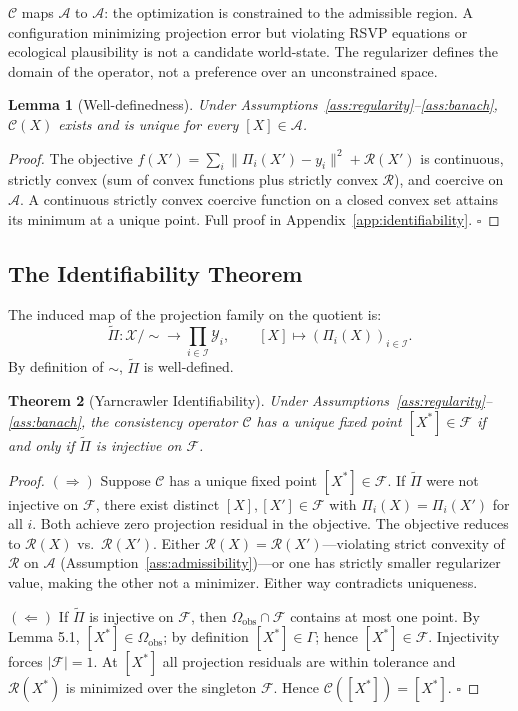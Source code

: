 \documentclass[11pt, oneside]{article}
\newtheorem{theorem}{Theorem}[section]
\newtheorem{lemma}[theorem]{Lemma}
\newcommand{\Xmod}{\mathcal{X}/{\sim}}
\newcommand{\Ftil}{\widetilde{\Pi}}
\begin{document}
$\mathcal{C}$ maps $\mathcal{A}$ to $\mathcal{A}$: the optimization is constrained to the
admissible region. A configuration minimizing projection error but violating RSVP equations
or ecological plausibility is not a candidate world-state. The regularizer defines the
domain of the operator, not a preference over an unconstrained space.

\begin{lemma}[Well-definedness]
Under Assumptions~\ref{ass:regularity}--\ref{ass:banach}, $\mathcal{C}(X)$ exists and is
unique for every $[X] \in \mathcal{A}$.
\end{lemma}
\begin{proof}
The objective $f(X') = \sum_i \|\Pi_i(X') - y_i\|^2 + \mathcal{R}(X')$ is continuous,
strictly convex (sum of convex functions plus strictly convex $\mathcal{R}$), and coercive
on $\mathcal{A}$. A continuous strictly convex coercive function on a closed convex set
attains its minimum at a unique point. Full proof in Appendix~\ref{app:identifiability}.
$\square$
\end{proof}

\subsection{The Identifiability Theorem}

The induced map of the projection family on the quotient is:
\[
\Ftil : \Xmod \longrightarrow \prod_{i \in \mathcal{I}} \mathcal{Y}_i, \qquad
[X] \mapsto (\Pi_i(X))_{i \in \mathcal{I}}.
\]
By definition of $\sim$, $\Ftil$ is well-defined.

\begin{theorem}[Yarncrawler Identifiability]
\label{thm:identifiability}
Under Assumptions~\ref{ass:regularity}--\ref{ass:banach}, the consistency operator
$\mathcal{C}$ has a unique fixed point $[X^*] \in \mathcal{F}$ if and only if $\Ftil$
is injective on $\mathcal{F}$.
\end{theorem}

\begin{proof}
$(\Rightarrow)$ Suppose $\mathcal{C}$ has a unique fixed point $[X^*] \in \mathcal{F}$.
If $\Ftil$ were not injective on $\mathcal{F}$, there exist distinct $[X],[X'] \in \mathcal{F}$
with $\Pi_i(X) = \Pi_i(X')$ for all $i$. Both achieve zero projection residual in the
objective. The objective reduces to $\mathcal{R}(X)$ vs.\ $\mathcal{R}(X')$. Either
$\mathcal{R}(X) = \mathcal{R}(X')$---violating strict convexity of $\mathcal{R}$ on
$\mathcal{A}$ (Assumption~\ref{ass:admissibility})---or one has strictly smaller
regularizer value, making the other not a minimizer. Either way contradicts uniqueness.

$(\Leftarrow)$ If $\Ftil$ is injective on $\mathcal{F}$, then $\Omega_{\mathrm{obs}} \cap
\mathcal{F}$ contains at most one point. By Lemma 5.1, $[X^*] \in \Omega_{\mathrm{obs}}$;
by definition $[X^*] \in \Gamma$; hence $[X^*] \in \mathcal{F}$. Injectivity forces
$|\mathcal{F}| = 1$. At $[X^*]$ all projection residuals are within tolerance and
$\mathcal{R}(X^*)$ is minimized over the singleton $\mathcal{F}$. Hence
$\mathcal{C}([X^*]) = [X^*]$. $\square$
\end{proof}
\end{document}
